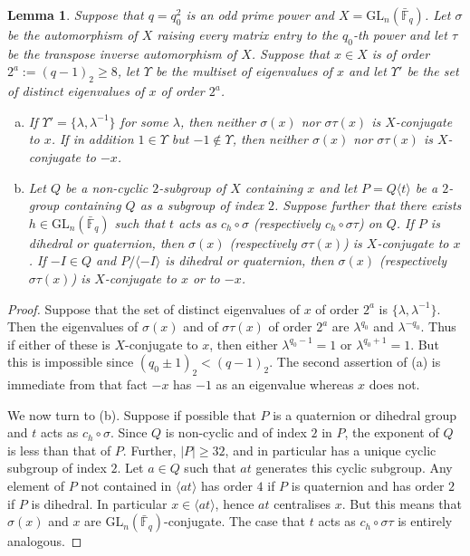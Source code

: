 \documentclass{amsart}
\theoremstyle{plain}\newtheorem{Theorem}{Theorem}[section]
\theoremstyle{plain}\newtheorem{Conjecture}[Theorem]{Conjecture}
\theoremstyle{plain}\newtheorem{Corollary}[Theorem]{Corollary}
\theoremstyle{plain}\newtheorem{Lemma}[Theorem]{Lemma}
\theoremstyle{plain}\newtheorem{Proposition}[Theorem]{Proposition}
\theoremstyle{definition}\newtheorem{Definition}[Theorem]{Definition}
\theoremstyle{definition}\newtheorem{Example}[Theorem]{Example}
\theoremstyle{definition}\newtheorem{Examples}[Theorem]{Examples}
\theoremstyle{definition}\newtheorem{Exercise}[Theorem]{Exercise}
\theoremstyle{definition}\newtheorem{Notation}[Theorem]{Notation}
\theoremstyle{definition}\newtheorem{Remark}[Theorem]{Remark}
\theoremstyle{definition}\newtheorem{Remarks}[Theorem]{Remarks}
\def\GL{\mathrm{GL}}
\numberwithin{equation}{section}
\begin{document}
\begin{Lemma} \label{lem:nofield} Suppose that $q=q_0^2$ is an odd prime power and  $ X=\GL_n(\bar{\mathbb F}_q)$.   Let $\sigma  $ be  the   automorphism of  $X$  raising every matrix entry to the  $q_0$-th power  and let $\tau $ be  the transpose inverse automorphism of $X$.  Suppose that   $x \in  X$  is  of order $ 2^a:=(q-1)_2 \geq 8$,  let $\Upsilon $ be  the multiset of eigenvalues of $x$  and let  $\Upsilon' $ be the  set of distinct eigenvalues of $x$ of order $2^a$.  
\begin{enumerate} [(a)]  \item If  $\Upsilon' =\{\lambda, \lambda^{-1} \}$  for some  $\lambda $,  then  neither $\sigma (x) $  nor  $\sigma\tau (x)$ is  $X$-conjugate to  $x$.  If  in addition  $1 \in \Upsilon $ but $-1 \notin 
\Upsilon $, then neither $\sigma (x) $  nor  $\sigma\tau (x)$ is  $X$-conjugate to  $-x$.
\item Let $Q$  be a non-cyclic $2$-subgroup of $X$ containing $x$ and let  $P =Q \langle t \rangle $ be a $2$-group containing $Q$  as  a  subgroup of index  $2$. Suppose further that  there exists $ h \in \GL_n(\bar {\mathbb F}_q)$ such that  $t$  acts as  $c_h \circ \sigma $  (respectively  $c_h \circ \sigma \tau$)  on $Q$. If $P$ is  dihedral or quaternion, then   $\sigma (x)  $  (respectively $\sigma \tau (x) $)   is $X$-conjugate to $x$. If  $ -I \in Q$  and   $P/  \langle  -I\rangle $  is dihedral or quaternion, then $\sigma (x)  $  (respectively $\sigma \tau (x) $)   is $X$-conjugate to $x$ or to $-x$.
\end{enumerate} 
\end{Lemma}



\begin{proof}  Suppose that the set of distinct eigenvalues of $x$ of order $2^a$    is   $\{\lambda, \lambda^{-1} \}$.
Then the eigenvalues  of $\sigma (x) $  and of $\sigma \tau (x)$  of order $2^a$ are $\lambda^{q_0} $ and  $\lambda^{-q_0} $.  Thus if either of these is $X$-conjugate to $x$, then either $\lambda^{q_0-1}=1$ or $\lambda^{q_0+1}=1$.  But this is impossible since $(q_0 \pm 1)_2 < (q-1)_2$.  The  second assertion of   (a) is  immediate  from that  fact  $-x$    has   $-1 $  as  an eigenvalue  whereas  $x$  does not. 

We now turn to (b). Suppose if possible that  $P$  is a quaternion or dihedral group and $t$  acts as $c_h \circ \sigma $.   
Since $Q$ is non-cyclic  and of index $2$  in $P$, the exponent of  $Q$ is  less than that of $P$.  
 Further,  $|P|  \geq  32 $, and in particular has a unique cyclic  subgroup of  index $2$. 
Let   $a \in Q $ such that $at$  generates this  cyclic  subgroup.   Any element of $P$ not contained in $\langle  at \rangle $ has order  $4$ if $P$ is quaternion and has order $2$ if $P$ is dihedral. In particular $x \in  \langle  at \rangle$,  hence $at$  centralises $x$.   But this  means that  $\sigma (x)$ and  $x$  are $\GL_n( \bar {\mathbb F}_q)$-conjugate.  The case that  $t$  acts as $c_h \circ \sigma \tau $ is entirely analogous.   
\end{proof}
\end{document}
